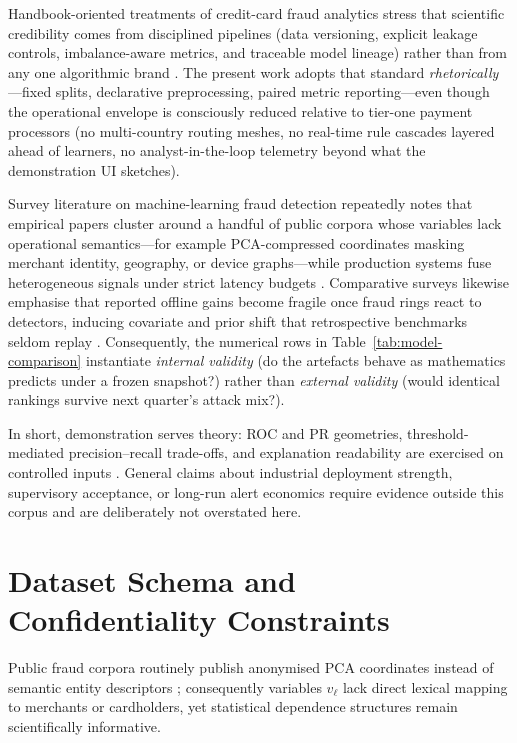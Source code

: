 Handbook-oriented treatments of credit-card fraud analytics stress that scientific credibility comes from disciplined pipelines (data versioning, explicit leakage controls, imbalance-aware metrics, and traceable model lineage) rather than from any one algorithmic brand \cite{fraud_handbook}. The present work adopts that standard \emph{rhetorically}—fixed splits, declarative preprocessing, paired metric reporting—even though the operational envelope is consciously reduced relative to tier-one payment processors (no multi-country routing meshes, no real-time rule cascades layered ahead of learners, no analyst-in-the-loop telemetry beyond what the demonstration UI sketches).

Survey literature on machine-learning fraud detection repeatedly notes that empirical papers cluster around a handful of public corpora whose variables lack operational semantics---for example PCA-compressed coordinates masking merchant identity, geography, or device graphs---while production systems fuse heterogeneous signals under strict latency budgets \cite{lucas_jurgovsky_ccfraud_survey2020,fraud_handbook}. Comparative surveys likewise emphasise that reported offline gains become fragile once fraud rings react to detectors, inducing covariate and prior shift that retrospective benchmarks seldom replay \cite{lucas_jurgovsky_ccfraud_survey2020,yousefi_fraud_survey2019}. Consequently, the numerical rows in Table~\ref{tab:model-comparison} instantiate \emph{internal validity} (do the artefacts behave as mathematics predicts under a frozen snapshot?) rather than \emph{external validity} (would identical rankings survive next quarter’s attack mix?).

In short, demonstration serves theory: ROC and PR geometries, threshold-mediated precision--recall trade-offs, and explanation readability are exercised on controlled inputs \cite{davis_goadrich_icml06,fraud_handbook}. General claims about industrial deployment strength, supervisory acceptance, or long-run alert economics require evidence outside this corpus and are deliberately not overstated here.

\section{Dataset Schema and Confidentiality Constraints}
Public fraud corpora routinely publish anonymised PCA coordinates instead of semantic entity descriptors \cite{credit_card_dataset,fraud_handbook}; consequently variables $v_\ell$ lack direct lexical mapping to merchants or cardholders, yet statistical dependence structures remain scientifically informative.

